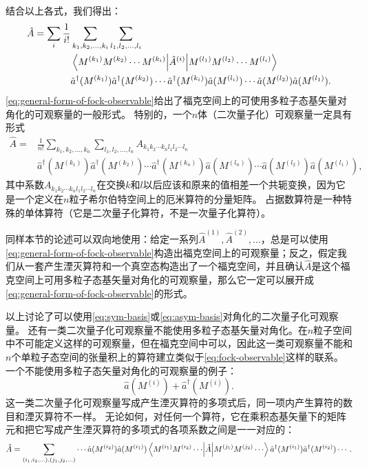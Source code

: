 \documentclass[UTF8, a4paper]{ctexart}
\begin{document}
结合以上各式，我们得出：
\begin{equation}
    \begin{aligned}
        \hat{A} = \sum_i \frac{1}{i!} &\sum_{k_1, k_2, \ldots, k_i} \sum_{l_1, l_2, \ldots, l_i} \\
        &\mel{M^{(k_1)} M^{(k_2)} \cdots M^{(k_i)}}{\hat{A}^{(i)}}{M^{(l_1)} M^{(l_2)} \cdots M^{(l_i)}} \\
        &\hat{a}^\dagger (M^{(k_1)}) \hat{a}^\dagger (M^{(k_2)}) \cdots \hat{a}^\dagger (M^{(k_i)}) \hat{a} (M^{(l_i)}) \cdots \hat{a} (M^{(l_2)}) \hat{a} (M^{(l_1)}).
        \label{eq:general-form-of-fock-observable}
    \end{aligned}
\end{equation}
\eqref{eq:general-form-of-fock-observable}给出了福克空间上的可使用多粒子态基矢量对角化的可观察量的一般形式。
特别的，一个$n$体（二次量子化）可观察量一定具有形式
\begin{equation}
    \begin{aligned}
        \hat{A} = &\frac{1}{n!} \sum_{k_1, k_2, \ldots, k_n} \sum_{l_1, l_2, \ldots, l_n} A_{k_1 k_2 \cdots k_n l_1 l_2 \cdots l_n} \\
        &\hat{a}^\dagger (M^{(k_1)}) \hat{a}^\dagger (M^{(k_2)}) \cdots \hat{a}^\dagger (M^{(k_n)}) \hat{a} (M^{(l_n)}) \cdots \hat{a} (M^{(l_2)}) \hat{a} (M^{(l_1)}),
    \end{aligned}
    \label{eq:n-particles-observable}
\end{equation}
其中系数$A_{k_1 k_2 \cdots k_n l_1 l_2 \cdots l_n}$在交换$k$和$l$以后应该和原来的值相差一个共轭变换，因为它是一个定义在$n$粒子希尔伯特空间上的厄米算符的分量矩阵。
占据数算符是一种特殊的单体算符（它是二次量子化算符，不是一次量子化算符）。

同样本节的论述可以双向地使用：给定一系列$\hat{A}^{(1)}, \hat{A}^{(2)}, \ldots$，总是可以使用\eqref{eq:general-form-of-fock-observable}构造出福克空间上的可观察量；反之，假定我们从一套产生湮灭算符和一个真空态构造出了一个福克空间，并且确认$\hat{A}$是这个福克空间上可用多粒子态基矢量对角化的可观察量，那么它一定可以展开成\eqref{eq:general-form-of-fock-observable}的形式。

以上讨论了可以使用\eqref{eq:sym-basis}或\eqref{eq:asym-basis}对角化的二次量子化可观察量。
还有一类二次量子化可观察量不能使用多粒子态基矢量对角化。在$n$粒子空间中不可能定义这样的可观察量，但在福克空间中可以，因此这一类可观察量不能和$n$个单粒子态空间的张量积上的算符建立类似于\eqref{eq:fock-observable}这样的联系。
一个不能使用多粒子态矢量对角化的可观察量的例子：
\[
    \hat{a}(M^{(i)}) + \hat{a}^\dagger(M^{(i)}).
\]
这一类二次量子化可观察量写成产生湮灭算符的多项式后，同一项内产生算符的数目和湮灭算符不一样。
无论如何，对任何一个算符，它在乘积态基矢量下的矩阵元和把它写成产生湮灭算符的多项式的各项系数之间是一一对应的：
\begin{equation}
    \hat{A} = \sum_{(i_1, i_2, \ldots), (j_1, j_2, \ldots)} \cdots \hat{a}(M^{(i_2)}) \hat{a}(M^{(i_1)}) \mel{M^{(i_1)} M^{(i_2)} \cdots}{\hat{A}}{M^{(j_1)} M^{(j_2)} \cdots} \hat{a}^\dagger(M^{(i_1)}) \hat{a}^\dagger(M^{(i_2)}) \cdots.
\end{equation}
\end{document}
